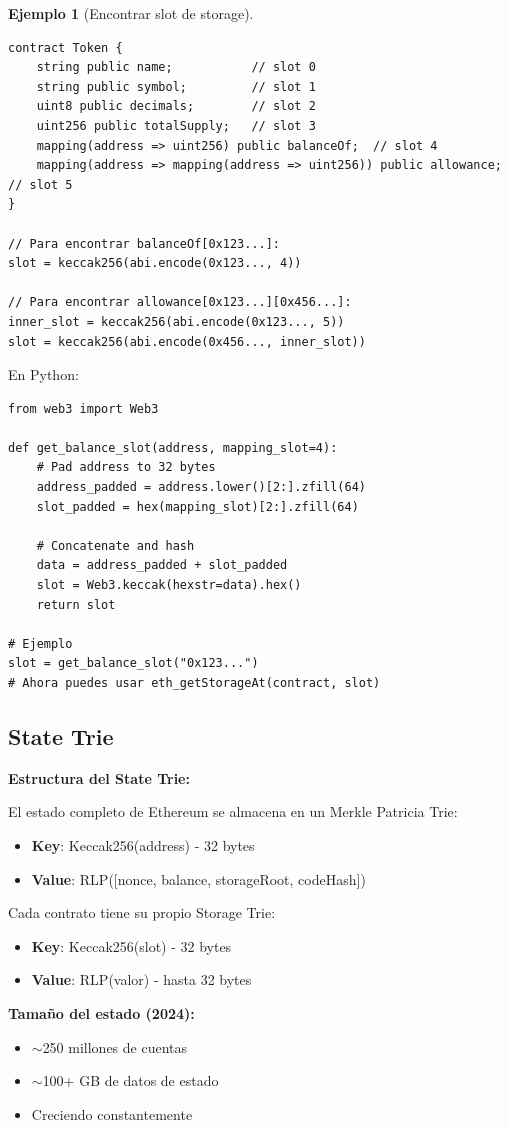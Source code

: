 \documentclass[11pt,a4paper,twoside,openright]{book}
\theoremstyle{definition}
\newtheorem{example}{Ejemplo}[chapter]
\theoremstyle{plain}
\theoremstyle{remark}
\begin{document}
\begin{example}[Encontrar slot de storage]
\begin{verbatim}
contract Token {
    string public name;           // slot 0
    string public symbol;         // slot 1  
    uint8 public decimals;        // slot 2
    uint256 public totalSupply;   // slot 3
    mapping(address => uint256) public balanceOf;  // slot 4
    mapping(address => mapping(address => uint256)) public allowance; // slot 5
}

// Para encontrar balanceOf[0x123...]:
slot = keccak256(abi.encode(0x123..., 4))

// Para encontrar allowance[0x123...][0x456...]:
inner_slot = keccak256(abi.encode(0x123..., 5))
slot = keccak256(abi.encode(0x456..., inner_slot))
\end{verbatim}

En Python:
\begin{verbatim}
from web3 import Web3

def get_balance_slot(address, mapping_slot=4):
    # Pad address to 32 bytes
    address_padded = address.lower()[2:].zfill(64)
    slot_padded = hex(mapping_slot)[2:].zfill(64)
    
    # Concatenate and hash
    data = address_padded + slot_padded
    slot = Web3.keccak(hexstr=data).hex()
    return slot

# Ejemplo
slot = get_balance_slot("0x123...")
# Ahora puedes usar eth_getStorageAt(contract, slot)
\end{verbatim}
\end{example}

\subsection{State Trie}

\begin{mathnote}
\textbf{Estructura del State Trie:}

El estado completo de Ethereum se almacena en un Merkle Patricia Trie:
\begin{itemize}
    \item \textbf{Key}: Keccak256(address) - 32 bytes
    \item \textbf{Value}: RLP([nonce, balance, storageRoot, codeHash])
\end{itemize}

Cada contrato tiene su propio Storage Trie:
\begin{itemize}
    \item \textbf{Key}: Keccak256(slot) - 32 bytes
    \item \textbf{Value}: RLP(valor) - hasta 32 bytes
\end{itemize}

\textbf{Tamaño del estado (2024):}
\begin{itemize}
    \item $\sim$250 millones de cuentas
    \item $\sim$100+ GB de datos de estado
    \item Creciendo constantemente
\end{itemize}
\end{mathnote}
\end{document}
